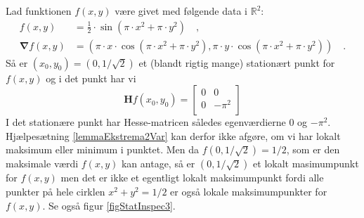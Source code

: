 \begin{example} \label{exampStatInspec3}
Lad funktionen $f(x,y)$ være givet med følgende data i $\mathbb{R}^{2}$:
\begin{equation}
\begin{aligned}
f(x,y) &= \frac{1}{2}\cdot \sin(\pi\cdot x^{2} + \pi \cdot y^{2}) \quad , \\
\bm{\nabla}f(x,y) &=  (\pi \cdot x\cdot \cos(\pi\cdot x^{2} + \pi \cdot y^{2}), \pi \cdot y\cdot \cos(\pi\cdot x^{2} + \pi \cdot y^{2}) ) \quad .
\end{aligned}
\end{equation}
Så er $(x_{0}, y_{0}) = (0, 1/\sqrt{2}) $ et (blandt rigtig mange) stationært punkt for $f(x,y)$ og i det punkt har vi
\begin{equation}
\bm{H}f(x_{0},y_{0}) = \left[
                                                                           \begin{array}{cc}
                                                                             0 & 0 \\
                                                                             0 & -\pi^{2}\\
                                                                           \end{array}
                                                                         \right]
\end{equation}
I det stationære punkt har Hesse-matricen således egenværdierne $0$ og $-\pi^{2}$. Hjælpesætning \ref{lemmaEkstrema2Var} kan derfor ikke afgøre, om vi har lokalt maksimum eller minimum i punktet. Men da $f(0, 1/\sqrt{2}) = 1/2$, som er den maksimale værdi $f(x,y)$ kan antage, så er $(0, 1/\sqrt{2})$ et lokalt masimumpunkt for $f(x,y)$ men det er ikke et egentligt lokalt maksimumpunkt fordi alle punkter på hele cirklen $x^{2} + y^{2} = 1/2$ er også lokale maksimumpunkter for $f(x,y)$. Se også figur \ref{figStatInspec3}.


\end{example}

